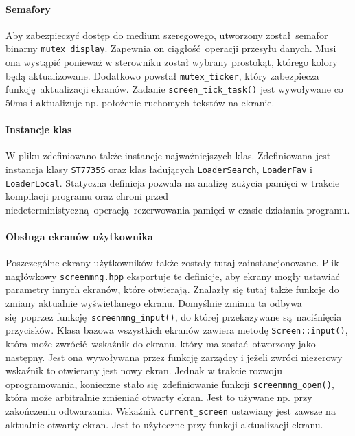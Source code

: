 \documentclass[12pt]{report}
\begin{document}
			\paragraph{Semafory}
				Aby zabezpieczyć dostęp do medium szeregowego, utworzony został semafor binarny \lstinline|mutex_display|. Zapewnia on ciągłość operacji przesyłu danych. Musi ona wystąpić ponieważ w sterowniku został wybrany prostokąt, którego kolory będą aktualizowane. Dodatkowo powstał \lstinline|mutex_ticker|, który zabezpiecza funkcję aktualizacji ekranów. Zadanie \lstinline|screen_tick_task()| jest wywoływane co 50ms i aktualizuje np. położenie ruchomych tekstów na ekranie.
				
			\paragraph{Instancje klas}
				W pliku zdefiniowano także instancje najważniejszych klas. Zdefiniowana jest instancja klasy \lstinline|ST7735S| oraz klas ładujących \lstinline|LoaderSearch|, \lstinline|LoaderFav| i \lstinline|LoaderLocal|. Statyczna definicja pozwala na analizę zużycia pamięci w trakcie kompilacji programu oraz chroni przed niedeterministyczną operacją rezerwowania pamięci w czasie działania programu.
				
			\paragraph{Obsługa ekranów użytkownika}
				Poszczególne ekrany użytkowników także zostały tutaj zainstancjonowane. Plik nagłówkowy \lstinline|screenmng.hpp| eksportuje te definicje, aby ekrany mogły ustawiać parametry innych ekranów, które otwierają. Znalazły się tutaj także funkcje do zmiany aktualnie wyświetlanego ekranu. Domyślnie zmiana ta odbywa się poprzez funkcję \lstinline|screenmng_input()|, do której przekazywane są naciśnięcia przycisków. Klasa bazowa wszystkich ekranów zawiera metodę \lstinline|Screen::input()|, która może zwrócić wskaźnik do ekranu, który ma zostać otworzony jako następny. Jest ona wywoływana przez funkcję zarządcy i jeżeli zwróci niezerowy wskaźnik to otwierany jest nowy ekran. Jednak w trakcie rozwoju oprogramowania, konieczne stało się zdefiniowanie funkcji \lstinline|screenmng_open()|, która może arbitralnie zmieniać otwarty ekran. Jest to używane np. przy zakończeniu odtwarzania. Wskaźnik \lstinline|current_screen| ustawiany jest zawsze na aktualnie otwarty ekran. Jest to użyteczne przy funkcji aktualizacji ekranu.
	
\end{document}
